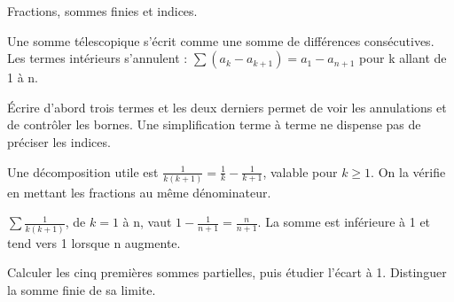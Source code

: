 \documentclass[11pt]{article}
\begin{document}
Fractions, sommes finies et indices.\par
{}
Une somme télescopique s’écrit comme une somme de différences consécutives. Les termes intérieurs s’annulent : \(\sum (a_{k}-a_{k+1})=a_{1}-a_{n+1}\) pour k allant de 1 à n.\par
Écrire d’abord trois termes et les deux derniers permet de voir les annulations et de contrôler les bornes. Une simplification terme à terme ne dispense pas de préciser les indices.\par
Une décomposition utile est \(\frac{1}{k(k+1)}=\frac{1}{k}-\frac{1}{k+1}\), valable pour \(k\geq 1\). On la vérifie en mettant les fractions au même dénominateur.\par
{}
\(\sum  \frac{1}{k(k+1)}\), de \(k=1\) à n, vaut \(1-\frac{1}{n+1}=\frac{n}{n+1}\). La somme est inférieure à 1 et tend vers 1 lorsque n augmente.\par
{}
Calculer les cinq premières sommes partielles, puis étudier l’écart à 1. Distinguer la somme finie de sa limite.\par
\end{document}

